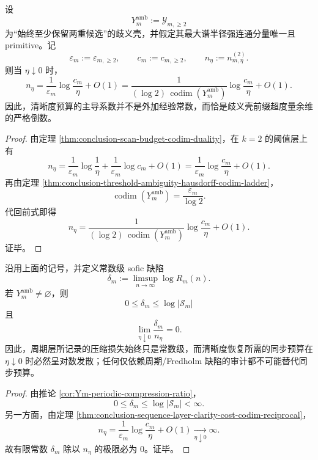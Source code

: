 \begin{theorem}[清晰度成本恰等于歧义壳余维的倒数尺度]\label{thm:conclusion-sequence-layer-clarity-cost-codim-reciprocal}
设
\[
Y_m^{\mathrm{amb}}:=\mathcal Y_{m,\ge 2}
\]
为“始终至少保留两重候选”的歧义壳，并假定其最大谱半径强连通分量唯一且 primitive。记
\[
\varepsilon_m:=\varepsilon_{m,\ge 2},
\qquad
c_m:=c_{m,\ge 2},
\qquad
n_\eta:=n_{m,\eta}^{(2)}.
\]
则当 \(\eta\downarrow 0\) 时，
\[
n_\eta
=
\frac{1}{\varepsilon_m}\log\frac{c_m}{\eta}+O(1)
=
\frac{1}{(\log 2)\,\operatorname{codim}(Y_m^{\mathrm{amb}})}
\log\frac{c_m}{\eta}+O(1).
\]
因此，清晰度预算的主导系数并不是外加经验常数，而恰是歧义壳前缀超度量余维的严格倒数。
\end{theorem}
\begin{proof}
由定理 \ref{thm:conclusion-scan-budget-codim-duality}，在 \(k=2\) 的阈值层上有
\[
n_\eta
=
\frac{1}{\varepsilon_m}\log\frac{1}{\eta}
+
\frac{1}{\varepsilon_m}\log c_m
+
O(1)
=
\frac{1}{\varepsilon_m}\log\frac{c_m}{\eta}+O(1).
\]
再由定理 \ref{thm:conclusion-threshold-ambiguity-hausdorff-codim-ladder}，
\[
\operatorname{codim}(Y_m^{\mathrm{amb}})
=
\frac{\varepsilon_m}{\log 2}.
\]
代回前式即得
\[
n_\eta
=
\frac{1}{(\log 2)\,\operatorname{codim}(Y_m^{\mathrm{amb}})}
\log\frac{c_m}{\eta}+O(1).
\]
证毕。
\end{proof}

\begin{theorem}[常数级周期缺陷不能替代对数级清晰度预算]\label{thm:conclusion-sequence-layer-constant-periodic-defect-cannot-replace-clarity-budget}
沿用上面的记号，并定义常数级 sofic 缺陷
\[
\delta_m:=\limsup_{n\to\infty}\log R_m(n).
\]
若 \(Y_m^{\mathrm{amb}}\neq\varnothing\)，则
\[
0\le \delta_m\le \log|\mathcal S_m|
\]
且
\[
\lim_{\eta\downarrow 0}\frac{\delta_m}{n_\eta}=0.
\]
因此，周期层所记录的压缩损失始终只是常数级，而清晰度恢复所需的同步预算在 \(\eta\downarrow 0\) 时必然呈对数发散；任何仅依赖周期/Fredholm 缺陷的审计都不可能替代同步预算。
\end{theorem}
\begin{proof}
由推论 \ref{cor:Ym-periodic-compression-ratio}，
\[
0\le \delta_m\le \log|\mathcal S_m|<\infty.
\]
另一方面，由定理 \ref{thm:conclusion-sequence-layer-clarity-cost-codim-reciprocal}，
\[
n_\eta=\frac{1}{\varepsilon_m}\log\frac{c_m}{\eta}+O(1)
\xrightarrow[\eta\downarrow 0]{}\infty.
\]
故有限常数 \(\delta_m\) 除以 \(n_\eta\) 的极限必为 \(0\)。证毕。
\end{proof}

